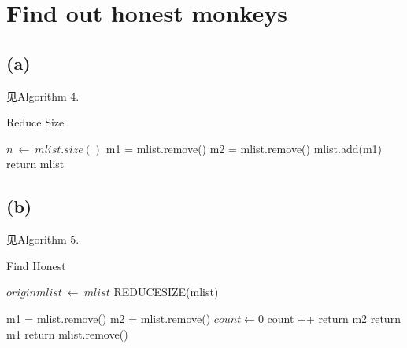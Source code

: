 \documentclass{article}
\begin{document}
\section{Find out honest monkeys}
\subsection{(a)}
见Algorithm 4.

\begin{algorithm}
\caption{Reduce Size}
\begin{algorithmic}[1]

\State $n\ \gets \ mlist.size()$
\State m1 = mlist.remove()
\State m2 = mlist.remove()
\State mlist.add(m1)
\EndIf
\EndFor
\State return mlist
\EndProcedure

\end{algorithmic}
\end{algorithm}

\subsection{(b)}
见Algorithm 5.

\begin{algorithm}
\caption{Find Honest}
\begin{algorithmic}[1]

\State $originmlist\ \gets \ mlist$
\State REDUCESIZE(mlist)
\EndWhile

\State m1 = mlist.remove()
\State m2 = mlist.remove()
\State $count \gets 0$
\State count ++
\State return m2
\Else
\State return m1
\EndIf
\Else
\State return mlist.remove()
\EndIf
\EndFor
\EndIf
\EndProcedure

\end{algorithmic}
\end{algorithm}
\end{document}
